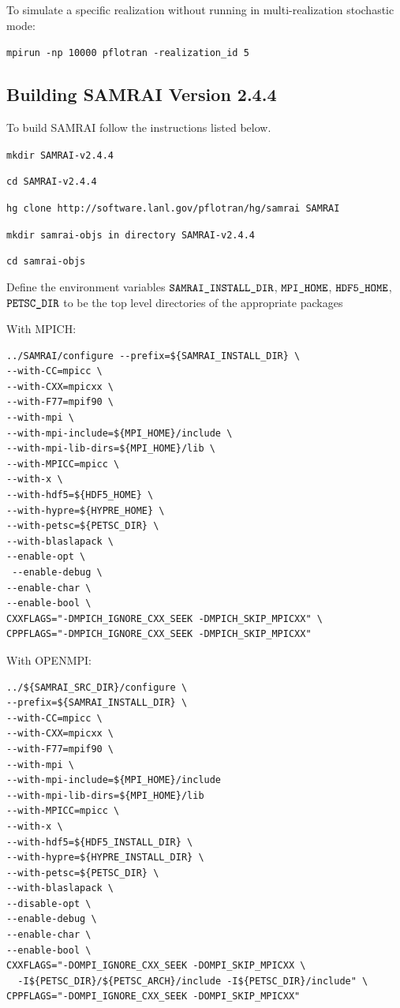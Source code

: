 \documentclass[12pt]{article}
\begin{document}
\noindent
To simulate a specific realization without running in multi-realization stochastic mode:

{\tt mpirun -np 10000 pflotran -realization\_id 5}

\subsection{Building SAMRAI Version 2.4.4}

\noindent
To build SAMRAI follow the instructions listed below.

{\tt mkdir SAMRAI-v2.4.4}

{\tt cd SAMRAI-v2.4.4}

{\tt hg clone http://software.lanl.gov/pflotran/hg/samrai SAMRAI}

{\tt mkdir samrai-objs in directory SAMRAI-v2.4.4}

{\tt cd samrai-objs}

Define the environment variables $\verb|SAMRAI_INSTALL_DIR|$, $\verb|MPI_HOME|$, $\verb|HDF5_HOME|$, \linebreak $\verb|PETSC_DIR|$ to be the top level directories of the appropriate packages

\noindent
With MPICH:
\begin{verbatim}
../SAMRAI/configure --prefix=${SAMRAI_INSTALL_DIR} \
--with-CC=mpicc \
--with-CXX=mpicxx \
--with-F77=mpif90 \
--with-mpi \
--with-mpi-include=${MPI_HOME}/include \
--with-mpi-lib-dirs=${MPI_HOME}/lib \
--with-MPICC=mpicc \
--with-x \
--with-hdf5=${HDF5_HOME} \
--with-hypre=${HYPRE_HOME} \
--with-petsc=${PETSC_DIR} \
--with-blaslapack \
--enable-opt \
 --enable-debug \
--enable-char \
--enable-bool \
CXXFLAGS="-DMPICH_IGNORE_CXX_SEEK -DMPICH_SKIP_MPICXX" \
CPPFLAGS="-DMPICH_IGNORE_CXX_SEEK -DMPICH_SKIP_MPICXX"
\end{verbatim}

\noindent
With OPENMPI:
\begin{verbatim}
../${SAMRAI_SRC_DIR}/configure \
--prefix=${SAMRAI_INSTALL_DIR} \
--with-CC=mpicc \
--with-CXX=mpicxx \
--with-F77=mpif90 \
--with-mpi \
--with-mpi-include=${MPI_HOME}/include 
--with-mpi-lib-dirs=${MPI_HOME}/lib 
--with-MPICC=mpicc \
--with-x \
--with-hdf5=${HDF5_INSTALL_DIR} \
--with-hypre=${HYPRE_INSTALL_DIR} \
--with-petsc=${PETSC_DIR} \
--with-blaslapack \
--disable-opt \
--enable-debug \
--enable-char \
--enable-bool \
CXXFLAGS="-DOMPI_IGNORE_CXX_SEEK -DOMPI_SKIP_MPICXX \
  -I${PETSC_DIR}/${PETSC_ARCH}/include -I${PETSC_DIR}/include" \
CPPFLAGS="-DOMPI_IGNORE_CXX_SEEK -DOMPI_SKIP_MPICXX"
\end{verbatim}
\end{document}
